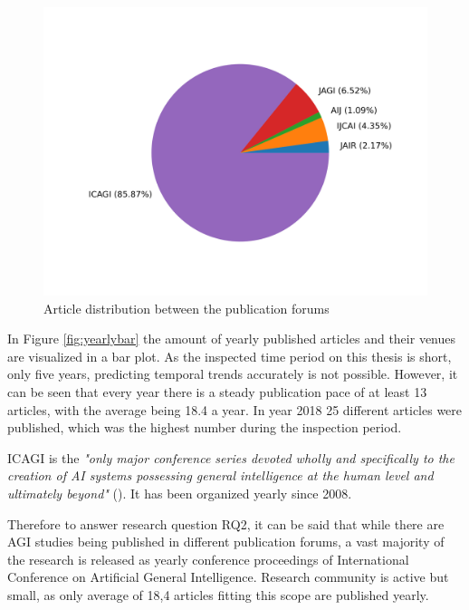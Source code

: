 \begin{figure}[H]
  \centering
  \includegraphics[scale=0.70]{material/data/forum_pie.png}
  \caption{Article distribution between the publication forums}
  \label{fig:forumpie}
\end{figure}

In Figure \ref{fig:yearlybar} the amount of yearly published articles and their
venues are visualized in a bar plot. As the inspected time period on this thesis
is short, only five years, predicting temporal trends accurately is not
possible. However, it can be seen that every year there is a steady publication
pace of at least 13 articles, with the average being 18.4 a year. In year 2018
25 different articles were published, which was the highest number during the
inspection period.

ICAGI is the \emph{"only major conference series devoted wholly and specifically to
the creation of AI systems possessing general intelligence at the human level
and ultimately beyond"} (\cite{icagihome}). It has been organized yearly since
2008.

Therefore to answer research question RQ2, it can be said that while there are
AGI studies being published in different publication forums, a vast majority of
the research is released as yearly conference proceedings of International
Conference on Artificial General Intelligence. Research community is active but
small, as only average of 18,4 articles fitting this scope are published yearly.

